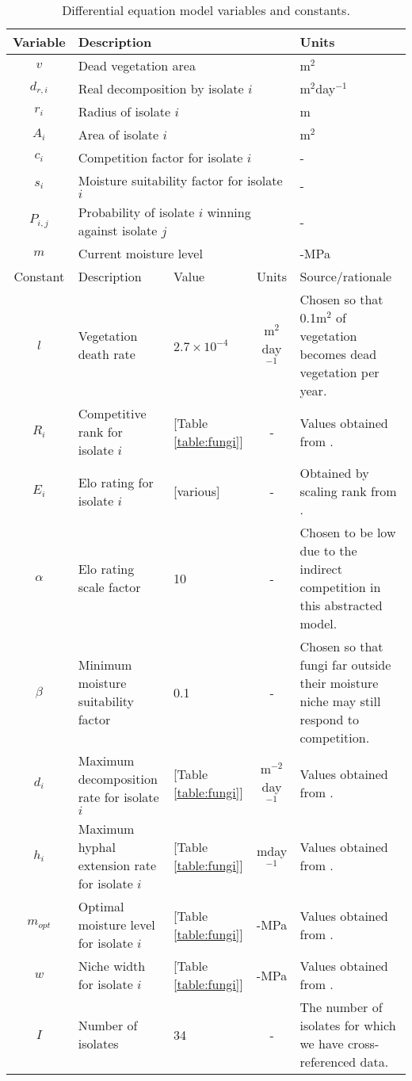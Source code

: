 \documentclass[12pt]{article}
\begin{document}
\begin{table}[!ht]
\centering
\caption{Differential equation model variables and constants.}
\begin{tabular}[t]{cp{1.8in}lcp{1.9in}}
\hline
Variable &\multicolumn{3}{l}{Description}&Units\\
\hline
$v$&\multicolumn{3}{l}{Dead vegetation area}&m$^2$\\
$d_{r,i}$&\multicolumn{3}{l}{Real decomposition by isolate $i$}&m$^{2}$day$^{-1}$\\
$r_i$&\multicolumn{3}{l}{Radius of isolate $i$}&m\\
$A_i$&\multicolumn{3}{l}{Area of isolate $i$ }&m$^2$\\
$c_i$&\multicolumn{3}{l}{Competition factor for isolate $i$} & -\\
$s_i$&\multicolumn{3}{l}{Moisture suitability factor for isolate $i$ }& -\\
$P_{i,j}$&\multicolumn{3}{l}{Probability of isolate $i$ winning against isolate $j$ }& -\\
$m$&\multicolumn{3}{l}{Current moisture level} &-MPa\\
\hline
Constant &Description&Value&Units&Source/rationale\\
\hline
$l$&Vegetation death rate&$2.7\times10^{-4}$&m$^2$day$^{-1}$&Chosen so that 0.1m$^2$ of vegetation becomes dead vegetation per year.\\
$R_i$&Competitive rank for isolate $i$ &[Table \ref{table:fungi}]&-&Values obtained from \cite{consistent_tradeoffs}.\\
$E_i$&Elo rating for isolate $i$ &[various]&-&Obtained by scaling rank from \cite{consistent_tradeoffs}.\\
$\alpha$&Elo rating scale factor&10&-&Chosen to be low due to the indirect competition in this abstracted model.\\
$\beta$&Minimum moisture suitability factor&0.1&-&Chosen so that fungi far outside their moisture niche may still respond to competition.\\
$d_i$&Maximum decomposition rate for isolate $i$ & [Table \ref{table:fungi}] & m$^{-2}$ day$^{-1}$ & Values obtained from \cite{trait-based}.\\
$h_i$&Maximum hyphal extension rate for isolate $i$ & [Table \ref{table:fungi}] & m\;day$^{-1}$ & Values obtained from \cite{consistent_tradeoffs}.\\
$m_{opt}$&Optimal moisture level for isolate $i$ & [Table \ref{table:fungi}] & -MPa & Values obtained from \cite{consistent_tradeoffs}.\\
$w$&Niche width for isolate $i$ & [Table \ref{table:fungi}] & -MPa & Values obtained from \cite{consistent_tradeoffs}.\\
$I$ & Number of isolates & 34 & - & The number of isolates for which we have cross-referenced data.\\\hline
\end{tabular}

\label{table:DEt}
\end{table}
\end{document}
